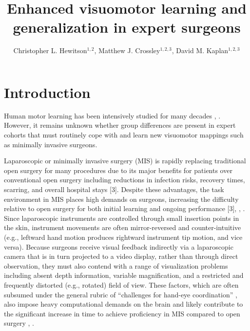 \documentclass[jou, 11pt, longtable, floatsintext, notab]{apa6}
\title{\textbf{Enhanced visuomotor learning and
    generalization in expert surgeons}}
\author{Christopher L. Hewitson$^{1,2}$, Matthew J.
  Crossley$^{1,2,3}$, David M. Kaplan$^{1,2,3}$}
\affiliation{
  $^1$Macquarie University \\
  $^2$Perception in Action Research Centre \\
  $^3$Centre for Elite Performance, Expertise \& Training}
\begin{document}
\maketitle

\section{Introduction}
Human motor learning has been intensively studied for many
decades \cite{shadmehr_error_2010},
\cite{krakauer_human_2011}. However, it remains unknown
whether group differences are present in expert cohorts that
must routinely cope with and learn new visuomotor mappings
such as minimally invasive surgeons.

Laparoscopic or minimally invasive surgery (MIS) is rapidly
replacing traditional open surgery for many procedures due
to its major benefits for patients over conventional open
surgery including reductions in infection risks, recovery
times, scarring, and overall hospital stays [3]. Despite
these advantages, the task environment in MIS places high
demands on surgeons, increasing the difficulty relative to
open surgery for both initial learning
\cite{braga_laparoscopic_2002} and ongoing performance [3],
\cite{den_boer_problems_2001}, \cite{joice_ergonomic_1998}.
Since laparoscopic instruments are controlled through small
insertion points in the skin, instrument movements are often
mirror-reversed and counter-intuitive (e.g., leftward hand
motion produces rightward instrument tip motion, and vice
versa). Because surgeons receive visual feedback indirectly
via a laparoscopic camera that is in turn projected to a
video display, rather than through direct observation, they
must also contend with a range of visualization problems
including absent depth information, variable magnification,
and a restricted and frequently distorted (e.g., rotated)
field of view. These factors, which are often subsumed under
the general rubric of ``challenges for hand-eye
coordination'' \cite{wentink_eye-hand_2001}, also impose
heavy computational demands on the brain and likely
contribute to the significant increase in time to achieve
proficiency in MIS compared to open surgery
\cite{rattner_beyond_1999}, \cite{schauer_learning_2003}.
\end{document}
